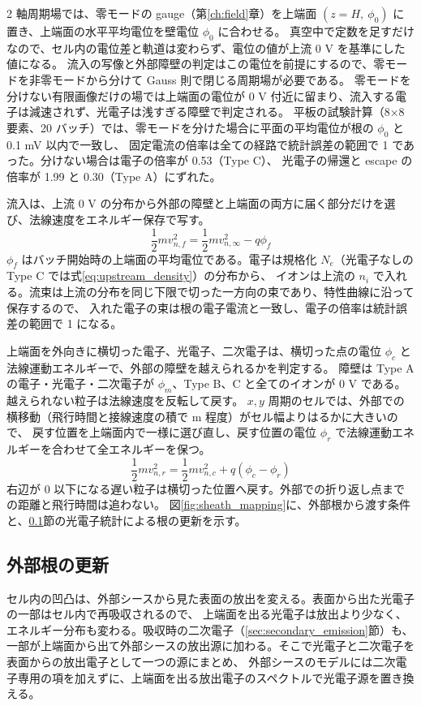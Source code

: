2 軸周期場では、零モードの gauge（第\ref{ch:field}章）を上端面 $(z=H,\ \phi_0)$ に置き、上端面の水平平均電位を壁電位 $\phi_0$ に合わせる。
真空中で定数を足すだけなので、セル内の電位差と軌道は変わらず、電位の値が上流 0 V を基準にした値になる。
流入の写像と外部障壁の判定はこの電位を前提にするので、零モードを非零モードから分けて Gauss 則で閉じる周期場が必要である。
零モードを分けない有限画像だけの場では上端面の電位が 0 V 付近に留まり、流入する電子は減速されず、光電子は浅すぎる障壁で判定される。
平板の試験計算（8×8 要素、20 バッチ）では、零モードを分けた場合に平面の平均電位が根の $\phi_0$ と 0.1 mV 以内で一致し、
固定電流の倍率は全ての経路で統計誤差の範囲で 1 であった。分けない場合は電子の倍率が 0.53（Type C）、
光電子の帰還と escape の倍率が 1.99 と 0.30（Type A）にずれた。

流入は、上流 0 V の分布から外部の障壁と上端面の両方に届く部分だけを選び、法線速度をエネルギー保存で写す。
\begin{equation}
 \frac12 m v_{n,f}^2=\frac12 m v_{n,\infty}^2-q\phi_f
 \label{eq:inflow_map}
\end{equation}
$\phi_f$ はバッチ開始時の上端面の平均電位である。電子は規格化 $N_e$（光電子なしの Type C では式\eqref{eq:upstream_density}）の分布から、
イオンは上流の $n_i$ で入れる。流束は上流の分布を同じ下限で切った一方向の束であり、特性曲線に沿って保存するので、
入れた電子の束は根の電子電流と一致し、電子の倍率は統計誤差の範囲で 1 になる。

上端面を外向きに横切った電子、光電子、二次電子は、横切った点の電位 $\phi_c$ と法線運動エネルギーで、外部の障壁を越えられるかを判定する。
障壁は Type A の電子・光電子・二次電子が $\phi_m$、Type B、C と全てのイオンが 0 V である。越えられない粒子は法線速度を反転して戻す。
$x,y$ 周期のセルでは、外部での横移動（飛行時間と接線速度の積で m 程度）がセル幅よりはるかに大きいので、
戻す位置を上端面内で一様に選び直し、戻す位置の電位 $\phi_r$ で法線運動エネルギーを合わせて全エネルギーを保つ。
\begin{equation}
 \frac12 m v_{n,r}^2=\frac12 m v_{n,c}^2+q(\phi_c-\phi_r)
 \label{eq:return_map}
\end{equation}
右辺が 0 以下になる遅い粒子は横切った位置へ戻す。外部での折り返し点までの距離と飛行時間は追わない。
図\ref{fig:sheath_mapping}に、外部根から渡す条件と、\ref{sec:sheath_refresh}節の光電子統計による根の更新を示す。


\subsection{外部根の更新}
\label{sec:sheath_refresh}
セル内の凹凸は、外部シースから見た表面の放出を変える。表面から出た光電子の一部はセル内で再吸収されるので、
上端面を出る光電子は放出より少なく、エネルギー分布も変わる。吸収時の二次電子（\ref{sec:secondary_emission}節）も、
一部が上端面から出て外部シースの放出源に加わる。そこで光電子と二次電子を表面からの放出電子として一つの源にまとめ、
外部シースのモデルには二次電子専用の項を加えずに、上端面を出る放出電子のスペクトルで光電子源を置き換える。

